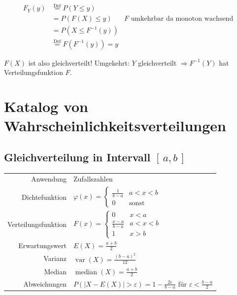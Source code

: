 \documentclass[10pt,a4paper]{scrartcl}
\DeclareMathOperator{\var}{var}
\DeclareMathOperator{\median}{median}
\begin{document}
\begin{align*}
  F_Y(y) & \stackrel{\text{Def}}{=} P(Y \le y) \\
         & = P(F(X) \le y)  & F \text{ umkehrbar da monoton wachsend} \\
         & = P(X \le F^{-1}(y)) \\
         & \stackrel{\text{Def}}{=} F(F^{-1}(y)) = y 
\end{align*}

$F(X)$ ist also gleichverteilt!
Umgekehrt: $Y$ gleichverteilt $\Rightarrow F^{-1}(Y)$ hat Verteilungsfunktion $F$.

\section{Katalog von Wahrscheinlichkeitsverteilungen}
\newlength{\katalogSpaltezwei}
\setlength{\katalogSpaltezwei}{11.5cm}

\subsection{Gleichverteilung in Intervall $[\,a, b\,]$}
\begin{tabular}{r p{\katalogSpaltezwei}}
Anwendung & Zufallszahlen \\
Dichtefunktion & $\varphi(x) = \begin{cases}\frac{1}{b-a} & a < x < b \\ 0 & \text{sonst} \end{cases} $ \\
Verteilungsfunktion & $F(x) = \begin{cases}0 & x < a \\ \frac{x-a}{b-a} & a < x < b \\ 1 & x > b\end{cases} $ \\
Erwartungswert & $E(X) = \frac{a+b}{2}$ \\
Varianz & $\var(X) = \frac{(b-a)^2}{12}$ \\
Median & $ \median(X) = \frac{a+b}{2} $ \\
Abweichungen & $P(|X - E(X)| > \varepsilon) = 1 - \frac{2\epsilon}{b-a}$ für $\varepsilon < \frac{b-a}{2}$
\end{tabular}
\end{document}
